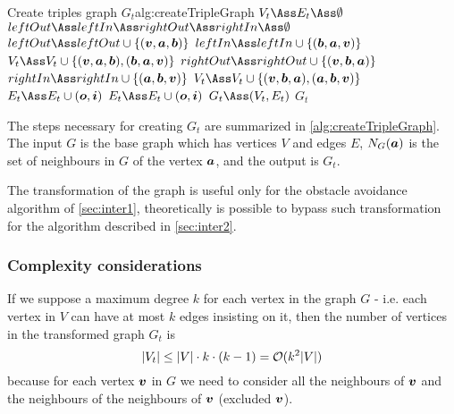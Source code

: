 \documentclass[dissertation.tex]{subfiles}
\begin{document}
\begin{algo}{Create triples graph $G_t$}{alg:createTripleGraph}
  \State $V_t\Ass E_t\Ass \emptyset$
  \label{ln:tripleFor0}
  \State $leftOut\Ass leftIn\Ass rightOut\Ass rightIn\Ass \emptyset$
  \State $leftOut \Ass leftOut\cup \{(\ve{v},\ve{a},\ve{b})\}$
  \State $leftIn \Ass leftIn\cup \{(\ve{b},\ve{a},\ve{v})\}$
  \State $V_t \Ass V_t\cup \{(\ve{v},\ve{a},\ve{b}), (\ve{b},\ve{a},\ve{v})\}$
  \EndFor
  \State $rightOut \Ass rightOut\cup \{(\ve{v},\ve{b},\ve{a})\}$
  \State $rightIn \Ass rightIn\cup \{(\ve{a},\ve{b},\ve{v})\}$
  \State $V_t \Ass V_t\cup \{(\ve{v},\ve{b},\ve{a}), (\ve{a},\ve{b},\ve{v})\}$
  \EndFor
  \State $E_t \Ass E_t\cup (\ve{o},\ve{i})$
  \EndFor
  \EndFor
  \label{ln:tripleFor1}
  \label{ln:tripleFor2}
  \State $E_t \Ass E_t\cup (\ve{o},\ve{i})$
  \EndFor
  \EndFor
  \EndFor
  \State $G_t\Ass(V_t,E_t)$
  \State\Return $G_t$
  \EndFunction
\end{algo}
The steps necessary for creating $G_t$ are summarized in
\cref{alg:createTripleGraph}. The input $G$ is the base graph
which has vertices $V$ and edges $E$, $N_G(\boldsymbol{a})$ is the set of
neighbours in $G$ of the vertex $\boldsymbol{a}$, and the output is $G_t$.

The transformation of the graph is useful only for the obstacle
avoidance algorithm of
\cref{sec:inter1}, theoretically is possible to bypass such
transformation for the algorithm described in \cref{sec:inter2}.

\subsubsection{Complexity considerations}
If we suppose a maximum degree $k$ for each vertex in the graph $G$ -
i.e. each vertex in $V$ can have at most $k$ edges insisting on
it, then the number of vertices in the transformed graph $G_t$ is 
\begin{equation}
  \label{eq:numTriples}
  |V_t|\leq |V|\cdot k\cdot(k-1)=\mathcal{O}(k^2|V|)
\end{equation}
because for each vertex $\boldsymbol{v}$ in $G$ we need to
consider all the neighbours of $\boldsymbol{v}$ and the neighbours of the neighbours
of $\boldsymbol{v}$ (excluded $\boldsymbol{v}$).
\end{document}
